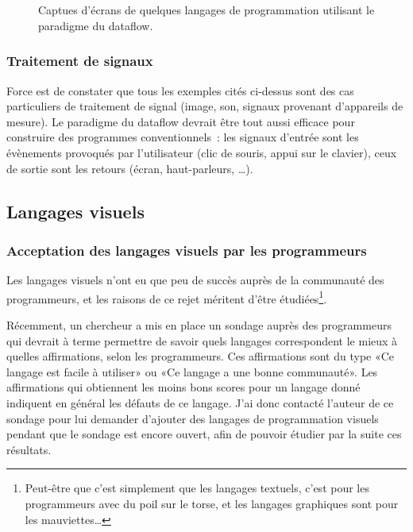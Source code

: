 \documentclass{article}
\begin{document}
\begin{figure}[ht]
  
  {\,}
  \hfill
  \begin{minipage}{10cm}
    \caption{Captues d'écrans de quelques langages de programmation utilisant le paradigme du dataflow.}
  \end{minipage}
  \hfill
  {\,}
  \label{fig:screenshots}
\end{figure}

\subsubsection{Traitement de signaux}

Force est de constater que tous les exemples cités ci-dessus sont des cas particuliers de traitement de signal (image, son, signaux
provenant d'appareils de mesure). Le paradigme du dataflow devrait être tout aussi efficace pour construire des programmes conventionnels~:
les signaux d'entrée sont les évènements provoqués par l'utilisateur (clic de souris, appui sur le clavier), ceux de sortie sont les retours
(écran, haut-parleurs, \dots).

\subsection{Langages visuels}

\subsubsection[Acceptation par les programmeurs]{Acceptation des langages visuels par les programmeurs}
Les langages visuels n'ont eu que peu de succès auprès de la communauté des programmeurs, et les raisons de ce rejet méritent d'être
étudiées\footnote{Peut-être que c'est simplement que les langages textuels, c'est pour les programmeurs avec du poil sur le torse, et les
  langages graphiques sont pour les mauviettes…}.

Récemment, un chercheur a mis en place un sondage auprès des programmeurs qui devrait à terme permettre de savoir quels langages
correspondent le mieux à quelles affirmations, selon les programmeurs\cite{the-right-tool}. Ces affirmations sont du type «Ce langage est
facile à utiliser» ou «Ce langage a une bonne communauté». Les affirmations qui obtiennent les moins bons scores pour un langage donné
indiquent en général les défauts de ce langage. J'ai donc contacté l'auteur de ce sondage pour lui demander d'ajouter des langages de
programmation visuels pendant que le sondage est encore ouvert, afin de pouvoir étudier par la suite ces résultats.
\end{document}

